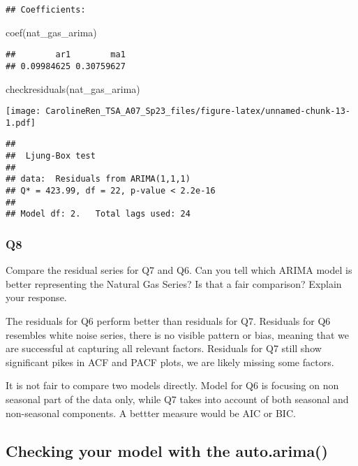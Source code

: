 \documentclass[
]{article}
\newenvironment{Shaded}{\begin{snugshade}}{\end{snugshade}}
\newcommand{\FunctionTok}[1]{\textcolor[rgb]{0.00,0.00,0.00}{#1}}
\newcommand{\NormalTok}[1]{#1}
\begin{document}
\begin{verbatim}
## Coefficients:
\end{verbatim}

\begin{Shaded}
\begin{Highlighting}[]
\FunctionTok{coef}\NormalTok{(nat\_gas\_arima)}
\end{Highlighting}
\end{Shaded}

\begin{verbatim}
##        ar1        ma1 
## 0.09984625 0.30759627
\end{verbatim}

\begin{Shaded}
\begin{Highlighting}[]
\FunctionTok{checkresiduals}\NormalTok{(nat\_gas\_arima)}
\end{Highlighting}
\end{Shaded}

\texttt{[image: CarolineRen\_TSA\_A07\_Sp23\_files/figure-latex/unnamed-chunk-13-1.pdf]}

\begin{verbatim}
## 
##  Ljung-Box test
## 
## data:  Residuals from ARIMA(1,1,1)
## Q* = 423.99, df = 22, p-value < 2.2e-16
## 
## Model df: 2.   Total lags used: 24
\end{verbatim}

\hypertarget{q8}{%
\subsubsection{Q8}\label{q8}}

Compare the residual series for Q7 and Q6. Can you tell which ARIMA
model is better representing the Natural Gas Series? Is that a fair
comparison? Explain your response.

The residuals for Q6 perform better than residuals for Q7. Residuals for
Q6 resembles white noise series, there is no visible pattern or bias,
meaning that we are successful at capturing all relevant factors.
Residuals for Q7 still show significant pikes in ACF and PACF plots, we
are likely missing some factors.

It is not fair to compare two models directly. Model for Q6 is focusing
on non seasonal part of the data only, while Q7 takes into account of
both seasonal and non-seasonal components. A bettter measure would be
AIC or BIC.

\hypertarget{checking-your-model-with-the-auto.arima}{%
\subsection{Checking your model with the
auto.arima()}\label{checking-your-model-with-the-auto.arima}}
\end{document}
